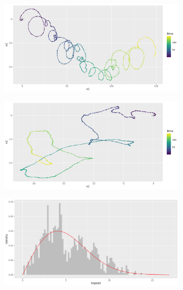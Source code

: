 \documentclass[11pt]{article}
\newcommand {\1}{\mathbb{1}}
\begin{document}
\begin{figure}[H]
	\centering
	\begin{subfigure}{0.48\textwidth}
		\centering
		\includegraphics[scale=0.3]{images/rcvm/tau5_nu5_omega1mu11_sigmaobs0.03 .png}
		\caption{}
	\end{subfigure}
\begin{subfigure}{0.48\textwidth}
	\centering
	\includegraphics[scale=0.3]{images/rcvm/tau5_nu1_omega0mu10_sigmaobs0.03 .png}
	\caption{}
\end{subfigure}
	\begin{subfigure}{0.48\textwidth}
		\centering
		\includegraphics[scale=0.3]{images/rcvm/hspeed_histo_tau5_nu5omega1_mu11_sigmaobs0.03 .png}

\end{subfigure}
\end{figure}
\end{document}
